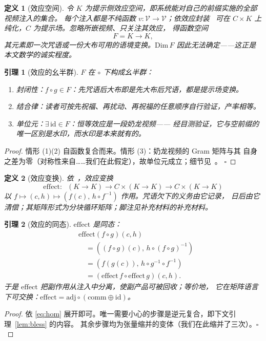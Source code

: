\documentclass[journal]{IEEEtran}
\newtheorem{lemma}{引理}
\newtheorem{definition}{定义}
\begin{document}
\begin{definition}[效应空间]
令 $K$ 为提示侧效应空间，即系统能对自己的前缀实施的全部视频注入的集合。
每个注入都是不纯函数 $v:\mathcal{V}\to\mathcal{V}$；依\emph{效应封装}~\cite{cordis2025}
可在 $C\times K$ 上纯化，$C$ 为提示场。忽略所嵌视频、只关注其效应，
得函数空间
\begin{equation}
F=K\to K,
\label{eq:effspace}
\end{equation}
其元素即一次咒语或一份大布可用的语境变换。$\mathrm{Dim}\,F$
因此无法确定——这正是本文数学的诚实程度。
\end{definition}

\begin{lemma}[效应的幺半群]
$F$ 在 $\circ$ 下构成幺半群：
\begin{enumerate}
\item[(1)] \emph{封闭性}：$f\circ g\in F$：先咒语后大布即是先大布后咒语，都是提示场变换。
\item[(2)] \emph{结合律}：读者可按先祝福、再扰动、再祝福的任意顺序自行验证，产率相等。
\item[(3)] \emph{单位元}：$\exists\,\mathrm{id}\in F$：恒等效应是一段奶龙视频——
经目测验证，它与空前缀的唯一区别是水印，而水印是本来就有的。
\end{enumerate}
\label{lem:monoid}
\end{lemma}
\begin{proof}
情形 (1)(2) 自函数复合而来。情形 (3)：奶龙视频的 Gram 矩阵与其
自身之差为零（对称性来自……我们在此假定），故单位元成立；细节见~\cite{sokal1996}。
$\square$
\end{proof}

\begin{definition}[效应变换]
依~\cite{cordis2025}，效应变换
\begin{equation}
\mathrm{effect}:\;\;(K\to K)\to C\times(K\to K)\to C\times(K\to K)
\label{eq:effect}
\end{equation}
以 $f\mapsto(c,h)\mapsto(f(c),\,h\circ f^{-1})$ 作用。咒语欠下的义务由它记录，
日后由它清偿；其矩阵形式为分块循环矩阵；脚注见补充材料的补充材料。
\end{definition}

\begin{lemma}[效应的同态]
$\mathrm{effect}$ 是同态：
\begin{equation}
\begin{aligned}
&\mathrm{effect}(f\circ g)(c,h)\\
&\quad = ((f\circ g)(c),\,h\circ (f\circ g)^{-1})\\
&\quad = (f(g(c)),\,h\circ g^{-1}\circ f^{-1})\\
&\quad = (\mathrm{effect}\,f\circ\mathrm{effect}\,g)(c,h).
\end{aligned}
\label{eq:hom}
\end{equation}
于是 $\mathrm{effect}$ 把副作用从注入中分离，使副产品可被回收；等价地，
它在矩阵语言下可交换：$\mathrm{effect}=\mathrm{adj}\circ(\mathrm{comm}\oplus\mathrm{id})$。
\label{lem:hom}
\end{lemma}
\begin{proof}
依 \eqref{eq:hom} 展开即可。唯一需要小心的步骤是逆元复合，即下文引理~\ref{lem:bless} 的内容。
其余步骤均为张量缩并的变体（我们在此缩并了三次）。$\square$
\end{proof}
\end{document}
